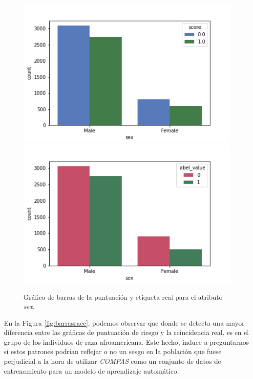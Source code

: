 \begin{figure}[h]
      \includegraphics[width=\linewidth]{images/score_sex.png}
    \endminipage\hfill
      \includegraphics[width=\linewidth]{images/label_sex.png}
    \endminipage
     \caption{Gráfico de barras de la puntuación y etiqueta real para el atributo \textit{sex}.}
     \label{fig:barrassex}
\end{figure}

En la Figura \ref{fig:barrasrace}, podemos observar que donde se detecta una mayor diferencia entre las gráficas de puntuación de riesgo y la reincidencia real, es en el grupo de los individuos de raza afroamericana. Este hecho, induce a preguntarnos si estos patrones podrían reflejar o no un sesgo en la población que fuese perjudicial a la hora de utilizar \textit{COMPAS} como un conjunto de datos de entrenamiento para un modelo de aprendizaje automático.

